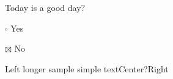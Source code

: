 \documentclass{article}
\begin{document}
Today is a good day?

$\square$ Yes 

$\boxtimes$ No


Left longer sample simple text\hfill Center?\hfill Right
\end{document}
